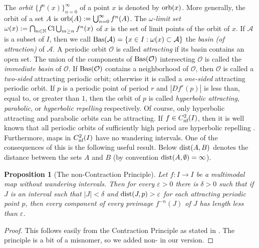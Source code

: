 \documentclass[12pt, psamsfonts, reqno]{amsart}
\newtheorem{proposition}[theorem]{Proposition}
\begin{document}
 The \emph{orbit} $\{f^n(x)\}_{n=0}^\infty$ of a point $x$
is denoted by ${\mathop{\rm orb}\nolimits}(x)$. More generally, the orbit of a set $A$ is
${\mathop{\rm orb}\nolimits}(A) := \bigcup_{n=0}^\infty f^n(A)$. The \emph{$\omega$-limit
set} $\omega(x) := \bigcap_{n \in {{\mathbb N}}} {\mathop{\rm Cl}\nolimits}\bigcup_{m \geq n}
f^n(x)$ of $x$ is the set of limit points of the orbit of $x$. If
${{\mathcal A}}$ is a subset of $I$, then we call ${\mathop{\rm Bas}\nolimits}({{\mathcal A}}) = \{ x \in I :
\omega(x) \subset {{\mathcal A}}\}$ the {\em basin (of attraction)} of ${{\mathcal A}}$. A
periodic orbit ${{\mathcal O}}$ is called \emph{attracting} if its basin
contains an open set. The union of the components of ${\mathop{\rm Bas}\nolimits}({{\mathcal O}})$
intersecting ${{\mathcal O}}$ is called the \emph{immediate basin} of ${{\mathcal O}}$. If
${\mathop{\rm Bas}\nolimits}({{\mathcal O}})$ contains a neighborhood of ${{\mathcal O}}$, then ${{\mathcal O}}$ is called a
\emph{two-sided} attracting periodic orbit; otherwise it is called
a \emph{one-sided} attracting periodic orbit. If $p$ is a periodic
point of period $r$ and $|Df^r(p)|$ is less than, equal to, or
greater than $1$, then the orbit of $p$ is called \emph{hyperbolic
attracting}, \emph{parabolic}, or \emph{hyperbolic repelling}
respectively. Of course, only hyperbolic attracting and parabolic
orbits can be attracting. If $f\in {C^2_{\text{\rm nf}}}(I)$, then it is well
known  that all periodic orbits of sufficiently high period are
hyperbolic repelling \cite{MMS}. Furthermore, maps in ${C^2_{\text{\rm nf}}}(I)$
have no wandering intervals. One of the consequences of this is
the following useful result. Below ${\mathop{\rm dist}\nolimits}(A,B)$ denotes the
distance between the sets $A$ and $B$ (by convention
${\mathop{\rm dist}\nolimits}(A,\emptyset)=\infty$).

\begin{proposition}[The non-Contraction Principle] \label{prop:contraction}
 Let $f:I\to I$ be a multimodal map without wandering
 intervals. Then for every ${\varepsilon}>0$ there is $\delta>0$ such that
 if $J$ is an interval such that  $|J|<\delta$ and ${\mathop{\rm dist}\nolimits}(J,p)>{\varepsilon}$
 for each attracting periodic point $p$, then every
 component of every preimage $f^{-n}(J)$ of $J$ has length less
 than ${\varepsilon}$.
\end{proposition}

\begin{proof}
This follows easily from the Contraction Principle as stated in \cite[p.
 305]{dMvS}. The principle is a bit of a misnomer, so we added
non- in our version.
\end{proof}
\end{document}
